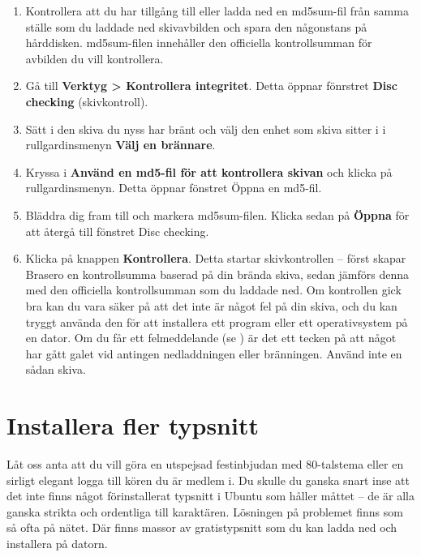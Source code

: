 \documentclass[a4paper,final]{memoir} %
\begin{document}
\begin{enumerate}

\item Kontrollera att du har tillgång till eller ladda ned en md5sum-fil från samma ställe som du laddade ned skivavbilden och spara den någonstans på hårddisken. md5sum-filen innehåller den officiella kontrollsumman för avbilden du vill kontrollera. 

\item Gå till \textbf{Verktyg \textgreater{} Kontrollera integritet}. Detta öppnar fönrstret \textbf{Disc checking} (skivkontroll).

\item Sätt i den skiva du nyss har bränt och välj den enhet som skiva sitter i i rullgardinsmenyn \textbf{Välj en brännare}.

\item Kryssa i \textbf{Använd en md5-fil för att kontrollera skivan} och klicka på rullgardinsmenyn. Detta öppnar fönstret Öppna en md5-fil.

\item Bläddra dig fram till och markera md5sum-filen. Klicka sedan på \textbf{Öppna} för att återgå till fönstret Disc checking.

\item Klicka på knappen \textbf{Kontrollera}. Detta startar skivkontrollen -- först skapar Brasero en kontrollsumma baserad på din brända skiva, sedan jämförs denna med den officiella kontrollsumman som du laddade ned. Om kontrollen gick bra kan du vara säker på att det inte är något fel på din skiva, och du kan tryggt använda den för att installera ett program eller ett operativsystem på en dator. Om du får ett felmeddelande (se ) är det ett tecken på att något har gått galet vid antingen nedladdningen eller bränningen. Använd inte en sådan skiva.


\end{enumerate}

\section{Installera fler typsnitt}


Låt oss anta att du vill göra en utspejsad festinbjudan med 80-talstema eller en sirligt elegant logga till kören du är medlem i. Du skulle du ganska snart inse att det inte finns något förinstallerat typsnitt i Ubuntu som håller måttet -- de är alla ganska strikta och ordentliga till karaktären. Lösningen på problemet finns som så ofta på nätet. Där finns massor av gratistypsnitt som du kan ladda ned och installera på datorn. 
\end{document}
